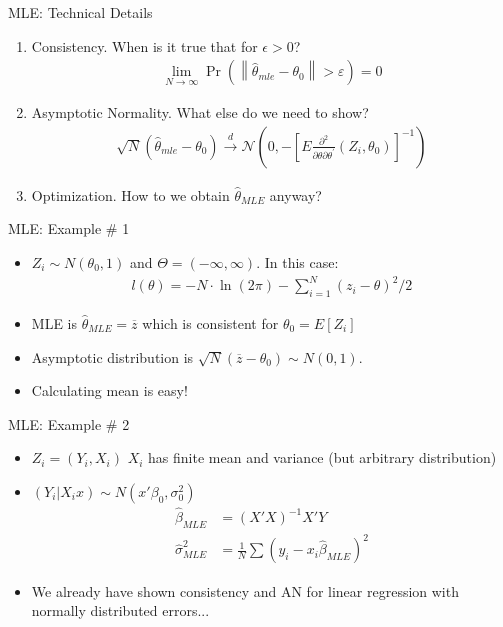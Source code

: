 \documentclass[aspectratio=169]{beamer}
\begin{document}
\begin{frame}{MLE: Technical Details}
\begin{enumerate}
\item Consistency. When is it true that for $\epsilon>0$?
\begin{align*}
\lim _ { N \rightarrow \infty } \operatorname { Pr } \left( \left\| \hat { \theta } _ { m l e } - \theta _ { 0 } \right\| > \varepsilon \right) = 0
\end{align*}
\item Asymptotic Normality. What else do we need to show?
\begin{align*}
\sqrt { N } \left( \hat { \theta } _ { m l e } - \theta _ { 0 } \right) \stackrel { d } { \longrightarrow } \mathcal { N } \left( 0 , - \left[ E \frac { \partial ^ { 2 } } { \partial \theta \partial \theta ^ { \prime } } \left( Z _ { i } , \theta _ { 0 } \right) \right] ^ { - 1 } \right)
\end{align*}
\item Optimization. How to we obtain $\widehat{\theta}_{MLE}$ anyway?
\end{enumerate}
\end{frame}


\begin{frame}{MLE: Example \# 1}
\begin{itemize}
\item $Z_i \sim N(\theta_0,1)$ and $\Theta = (-\infty,\infty)$. In this case:
\begin{align*}
l ( \theta ) = - N \cdot \ln ( 2 \pi ) - \sum _ { i = 1 } ^ { N } \left( z _ { i } - \theta \right) ^ { 2 } / 2
\end{align*}
\item MLE is $\widehat{\theta}_{MLE}=\overline{z}$ which is consistent for $\theta_0 = E[Z_i]$
\item Asymptotic distribution is $\sqrt{N} ( \overline{z}-\theta_0) \sim N(0,1)$.
\item Calculating mean is easy!
\end{itemize}
\end{frame}




\begin{frame}{MLE: Example \# 2}
\begin{itemize}
\item $Z_i = (Y_i, X_i)$  $X_i$ has finite mean and variance (but arbitrary distribution)
\item $(Y_i | X_i  x) \sim N(x' \beta_0, \sigma_0^2)$
\begin{align*}
\widehat{\beta}_{MLE} &= (X'X)^{-1} X'Y\\
\widehat{\sigma}^2_{MLE} &= \frac{1}{N} \sum (y_i - x_i \widehat{\beta}_{MLE})^2
\end{align*}
\item We already have shown consistency and AN for linear regression with normally distributed errors...
\end{itemize}
\end{frame}
\end{document}
